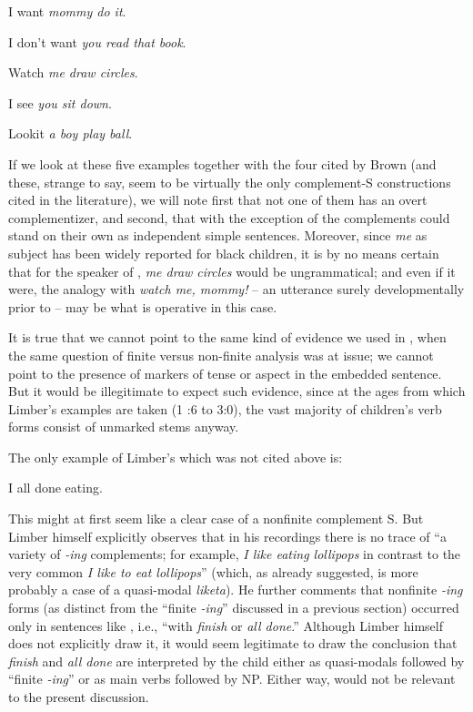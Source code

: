 \ea\label{ex:3:32}
I want \textit{mommy do it}.
\z

\ea\label{ex:3:33}
 I don't want \textit{you read that book}.
\z

\ea\label{ex:3:34}
 Watch \textit{me draw circles}.
\z

\ea\label{ex:3:35}
 I see \textit{you sit down}.
\z

\ea\label{ex:3:36}
 Lookit \textit{a boy play ball}.
\z

If we look at these five examples together with the four cited by Brown (and these, strange to say, seem to be virtually the only complement-S constructions cited in the literature), we will note first that not one of them has an overt complementizer, and second, that with the exception of  the complements could stand on their own as independent simple sentences. Moreover, since \textit{me} as subject has been widely reported for black children, it is by no means certain that for the speaker of , \textit{me draw circles} would be ungrammatical; and even if it were, the analogy with \textit{watch me, mommy!} -- an utterance surely developmentally prior to  -- may be what is operative in this case.

It is true that we cannot point to the same kind of evidence
we used in , when the same question of finite versus non-finite analysis was at issue; we cannot point to the presence of markers of tense or aspect in the embedded sentence. But it would be illegitimate to expect such evidence, since at the ages from which Limber's examples are taken (1 :6 to 3:0), the vast majority of children's verb forms consist of unmarked stems anyway.

The only example of Limber's which was not cited above is:

\ea\label{ex:3:37}
 I all done eating.
\z

\noindent This might at first seem like a clear case of a nonfinite complement S. But Limber himself explicitly observes that in his recordings there is no trace of ``a variety of \textit{-ing} complements; for example, \textit{I like eating lollipops} in contrast to the very common \textit{I like to eat lollipops}'' (which, as already suggested, is more probably a case of a quasi-modal \textit{liketa}). He further comments that nonfinite \textit{-ing} forms (as distinct from the ``finite \textit{-ing}'' discussed in a previous section) occurred only in sentences like , i.e., ``with \textit{finish} or \textit{all done}.'' Although Limber himself does not explicitly draw it, it would seem legitimate to draw the conclusion that \textit{finish} and \textit{all done} are interpreted by the child either as quasi-modals followed by ``finite \textit{-ing}'' or as main verbs followed by NP. Either way,  would not be relevant to the present discussion.

